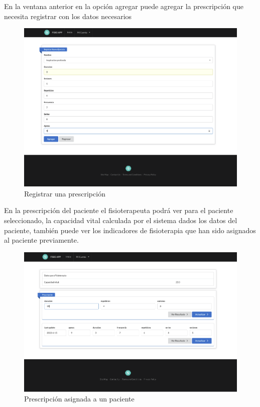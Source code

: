 \documentclass[12pt]{article}
\begin{document}
En la ventana anterior en la opción agregar puede agregar la prescripción que necesita registrar con los datos necesarios


\begin{figure}[ht]
\centering
\includegraphics[scale=0.3]{imag/appregistrarpreescripcion.png}
\caption{Registrar una prescripción}
\label{6}
\end{figure}
\FloatBarrier


En la prescripción del paciente el fisioterapeuta podrá ver para el paciente seleccionado, la capacidad vital calculada por el sistema dados los datos del paciente, también puede ver los indicadores de fisioterapia que han sido asignados al paciente previamente.

\begin{figure}[ht]
\centering
\includegraphics[scale=0.3]{imag/appprescripcionuser.png}
\caption{Prescripción asignada a un paciente}
\label{6}
\end{figure}
\FloatBarrier
\end{document}
